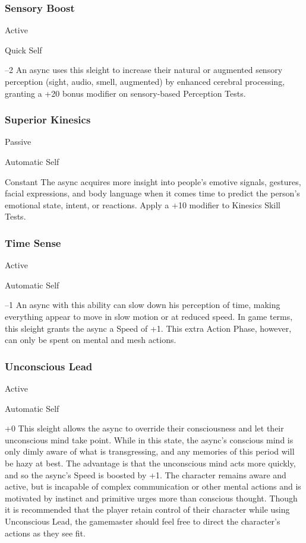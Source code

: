 \subsubsection{Sensory Boost}


  

Active

   Quick
 Self

  

   –2
An async uses this sleight to increase their natural or 
augmented sensory perception (sight, audio, smell, 
augmented) by enhanced cerebral processing, granting
a +20 bonus modifier on sensory-based Perception
Tests.

\subsubsection{Superior Kinesics}


  

Passive

   Automatic
 Self

   Constant
The async acquires more insight into people's emotive
signals, gestures, facial expressions, and body
language when it comes time to predict the person's 
emotional state, intent, or reactions. Apply a +10 
modifier to Kinesics Skill Tests.

\subsubsection{Time Sense}


  

Active

   Automatic
 Self

  

   –1
An async with this ability can slow down his perception
of time, making everything appear to move
in slow motion or at reduced speed. In game terms, 
this sleight grants the async a Speed of +1. This extra 
Action Phase, however, can only be spent on mental 
and mesh actions.

\subsubsection{Unconscious Lead}


  

Active

   Automatic
 Self

  

   +0
This sleight allows the async to override their consciousness
and let their unconscious mind take point.
While in this state, the async's conscious mind is only 
dimly aware of what is transgressing, and any memories
of this period will be hazy at best. The advantage
is that the unconscious mind acts more quickly, and 
so the async's Speed is boosted by +1. The character 
remains aware and active, but is incapable of complex
communication or other mental actions and is
motivated by instinct and primitive urges more than 
conscious thought. Though it is recommended that 
the player retain control of their character while using 
Unconscious Lead, the gamemaster should feel free to 
direct the character's actions as they see fit.

